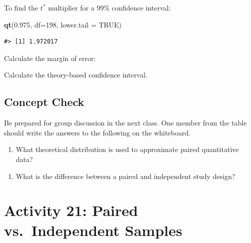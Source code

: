 \documentclass[
]{report}
\newenvironment{Shaded}{\begin{snugshade}}{\end{snugshade}}
\newcommand{\AttributeTok}[1]{\textcolor[rgb]{0.13,0.29,0.53}{#1}}
\newcommand{\ConstantTok}[1]{\textcolor[rgb]{0.56,0.35,0.01}{#1}}
\newcommand{\DecValTok}[1]{\textcolor[rgb]{0.00,0.00,0.81}{#1}}
\newcommand{\FloatTok}[1]{\textcolor[rgb]{0.00,0.00,0.81}{#1}}
\newcommand{\FunctionTok}[1]{\textcolor[rgb]{0.13,0.29,0.53}{\textbf{#1}}}
\newcommand{\NormalTok}[1]{#1}
\providecommand{\tightlist}{%
  \setlength{\itemsep}{0pt}\setlength{\parskip}{0pt}}
\begin{document}
To find the \(t^*\) multiplier for a 99\% confidence interval:

\begin{Shaded}
\begin{Highlighting}[]
\FunctionTok{qt}\NormalTok{(}\FloatTok{0.975}\NormalTok{, }\AttributeTok{df=}\DecValTok{198}\NormalTok{, }\AttributeTok{lower.tail =} \ConstantTok{TRUE}\NormalTok{)}
\end{Highlighting}
\end{Shaded}

\begin{verbatim}
#> [1] 1.972017
\end{verbatim}

Calculate the margin of error:
\vspace{0.4in}

Calculate the theory-based confidence interval.
\vspace{0.5in}

\subsection{Concept Check}\label{concept-check}

Be prepared for group discussion in the next class. One member from the table should write the answers to the following on the whiteboard.

\begin{enumerate}
\def\labelenumi{\arabic{enumi}.}
\tightlist
\item
  What theoretical distribution is used to approximate paired quantitative data?
\end{enumerate}

\vspace{0.2in}

\begin{enumerate}
\def\labelenumi{\arabic{enumi}.}
\setcounter{enumi}{1}
\tightlist
\item
  What is the difference between a paired and independent study design?
\end{enumerate}

\vspace{1in}

\newpage

\section{Activity 21: Paired vs.~Independent Samples}\label{activity-21-paired-vs.-independent-samples}
\end{document}
